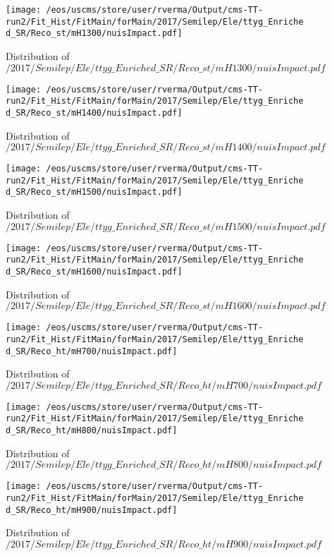 \begin{figure}
\centering
\texttt{[image: /eos/uscms/store/user/rverma/Output/cms-TT-run2/Fit\_Hist/FitMain/forMain/2017/Semilep/Ele/ttyg\_Enriched\_SR/Reco\_st/mH1300/nuisImpact.pdf]}
\caption{Distribution of $/2017/Semilep/Ele/ttyg\_Enriched\_SR/Reco\_st/mH1300/nuisImpact.pdf$}
\end{figure}

\begin{figure}
\centering
\texttt{[image: /eos/uscms/store/user/rverma/Output/cms-TT-run2/Fit\_Hist/FitMain/forMain/2017/Semilep/Ele/ttyg\_Enriched\_SR/Reco\_st/mH1400/nuisImpact.pdf]}
\caption{Distribution of $/2017/Semilep/Ele/ttyg\_Enriched\_SR/Reco\_st/mH1400/nuisImpact.pdf$}
\end{figure}

\begin{figure}
\centering
\texttt{[image: /eos/uscms/store/user/rverma/Output/cms-TT-run2/Fit\_Hist/FitMain/forMain/2017/Semilep/Ele/ttyg\_Enriched\_SR/Reco\_st/mH1500/nuisImpact.pdf]}
\caption{Distribution of $/2017/Semilep/Ele/ttyg\_Enriched\_SR/Reco\_st/mH1500/nuisImpact.pdf$}
\end{figure}

\begin{figure}
\centering
\texttt{[image: /eos/uscms/store/user/rverma/Output/cms-TT-run2/Fit\_Hist/FitMain/forMain/2017/Semilep/Ele/ttyg\_Enriched\_SR/Reco\_st/mH1600/nuisImpact.pdf]}
\caption{Distribution of $/2017/Semilep/Ele/ttyg\_Enriched\_SR/Reco\_st/mH1600/nuisImpact.pdf$}
\end{figure}

\begin{figure}
\centering
\texttt{[image: /eos/uscms/store/user/rverma/Output/cms-TT-run2/Fit\_Hist/FitMain/forMain/2017/Semilep/Ele/ttyg\_Enriched\_SR/Reco\_ht/mH700/nuisImpact.pdf]}
\caption{Distribution of $/2017/Semilep/Ele/ttyg\_Enriched\_SR/Reco\_ht/mH700/nuisImpact.pdf$}
\end{figure}

\begin{figure}
\centering
\texttt{[image: /eos/uscms/store/user/rverma/Output/cms-TT-run2/Fit\_Hist/FitMain/forMain/2017/Semilep/Ele/ttyg\_Enriched\_SR/Reco\_ht/mH800/nuisImpact.pdf]}
\caption{Distribution of $/2017/Semilep/Ele/ttyg\_Enriched\_SR/Reco\_ht/mH800/nuisImpact.pdf$}
\end{figure}

\begin{figure}
\centering
\texttt{[image: /eos/uscms/store/user/rverma/Output/cms-TT-run2/Fit\_Hist/FitMain/forMain/2017/Semilep/Ele/ttyg\_Enriched\_SR/Reco\_ht/mH900/nuisImpact.pdf]}
\caption{Distribution of $/2017/Semilep/Ele/ttyg\_Enriched\_SR/Reco\_ht/mH900/nuisImpact.pdf$}
\end{figure}

